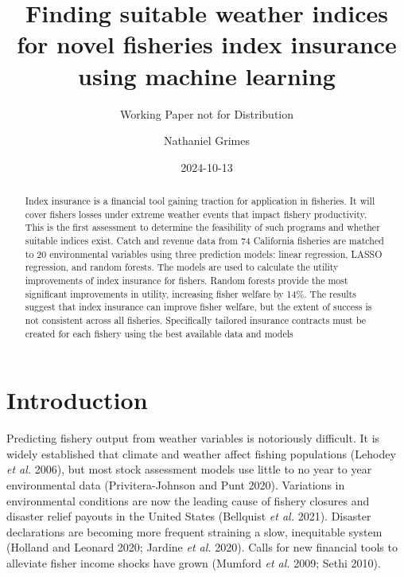 \documentclass[
  letterpaper,
  DIV=11,
  numbers=noendperiod]{scrartcl}
\title{Finding suitable weather indices for novel fisheries index
insurance using machine learning}
\subtitle{Working Paper not for Distribution}
\author{Nathaniel Grimes}
\date{2024-10-13}
\renewcommand*\contentsname{Table of contents}
\newcommand\contentsname{Table of contents}
\begin{document}
\maketitle
\begin{abstract}
Index insurance is a financial tool gaining traction for application in
fisheries. It will cover fishers losses under extreme weather events
that impact fishery productivity. This is the first assessment to
determine the feasibility of such programs and whether suitable indices
exist. Catch and revenue data from 74 California fisheries are matched
to 20 environmental variables using three prediction models: linear
regression, LASSO regression, and random forests. The models are used to
calculate the utility improvements of index insurance for fishers.
Random forests provide the most significant improvements in utility,
increasing fisher welfare by 14\%. The results suggest that index
insurance can improve fisher welfare, but the extent of success is not
consistent across all fisheries. Specifically tailored insurance
contracts must be created for each fishery using the best available data
and models
\end{abstract}
\ifdefined\Shaded\renewenvironment{Shaded}{\begin{tcolorbox}[interior hidden, frame hidden, sharp corners, boxrule=0pt, borderline west={3pt}{0pt}{shadecolor}, enhanced, breakable]}{\end{tcolorbox}}\fi

\renewcommand*\contentsname{Table of contents}
{
\hypersetup{linkcolor=}
\setcounter{tocdepth}{3}
\tableofcontents
}
\hypertarget{introduction}{%
\section{Introduction}\label{introduction}}

Predicting fishery output from weather variables is notoriously
difficult. It is widely established that climate and weather affect
fishing populations (Lehodey \emph{et al.} 2006), but most stock
assessment models use little to no year to year environmental data
(Privitera-Johnson and Punt 2020). Variations in environmental
conditions are now the leading cause of fishery closures and disaster
relief payouts in the United States (Bellquist \emph{et al.} 2021).
Disaster declarations are becoming more frequent straining a slow,
inequitable system (Holland and Leonard 2020; Jardine \emph{et al.}
2020). Calls for new financial tools to alleviate fisher income shocks
have grown (Mumford \emph{et al.} 2009; Sethi 2010).
\end{document}
